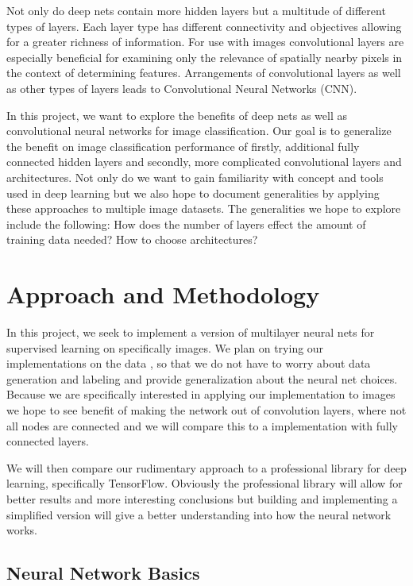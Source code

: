\documentclass[12pt, twocolumn]{article}
\begin{document}
Not only do deep nets contain more hidden layers but a multitude of different types of layers. Each layer type has different connectivity and objectives allowing for a greater richness of information. For use with images convolutional layers are especially beneficial for examining only the relevance of spatially nearby pixels in the context of determining features. Arrangements of convolutional layers as well as other types of layers leads to Convolutional Neural Networks (CNN). 

In this project, we want to explore the benefits of deep nets as well as convolutional neural networks for image classification.  Our goal is to generalize the benefit on image classification performance of firstly, additional fully connected hidden layers and secondly, more complicated convolutional layers and architectures. Not only do we want to gain familiarity with concept and tools used in deep learning but we also hope to document generalities by applying these approaches to multiple image datasets. The generalities we hope to explore include the following: How does the number of layers effect the amount of training data needed? How to choose architectures? 

\section{Approach and Methodology}
	
In this project, we seek to implement a version of multilayer neural nets for supervised learning on specifically images. We plan on trying our implementations on the data , so that we do not have to worry about data generation and labeling and provide generalization about the neural net choices. Because we are specifically interested in applying our implementation to images we hope to see benefit of making the network out of convolution layers, where not all nodes are connected and we will compare this to a implementation with fully connected layers.

 We will then compare our rudimentary approach to a professional library for deep learning, specifically TensorFlow. Obviously the professional library will allow for better results and more interesting conclusions but building and implementing a simplified version will give a better understanding into how the neural network works. 

\subsection{Neural Network Basics}
\end{document}
